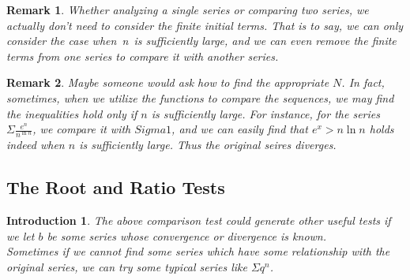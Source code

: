 \documentclass[12pt]{article}
\theoremstyle{oneline}
\newtheorem{remark}{Remark}[subsection]
\theoremstyle{twoline}
\newtheorem{introduction}{Introduction}
\begin{document}
\begin{remark}
  Whether analyzing a single series or comparing two series, we actually don't need to consider the finite initial terms. That is to say, we can only consider the case when n is sufficiently large, and we can even remove the finite terms from one series to compare it with another series.
\end{remark}

\begin{remark}
  Maybe someone would ask how to find the appropriate $N$. In fact, sometimes, when we utilize the functions to compare the sequences, we may find the inequalities hold only if $n$ is sufficiently large. For instance, for the series $\Sigma \frac{e^n}{n^{\ln n}}$, we compare it with $Sigma 1$, and we can easily find that $e^x>n\ln n$ holds indeed when $n$ is sufficiently large. Thus the original seires diverges.
\end{remark}

\subsection{The Root and Ratio Tests}
\begin{introduction}
  \hspace*{2em}
  The above comparison test could generate other useful tests if we let $b$ be some series whose convergence or divergence is known.\\
  \hspace*{2em} 
  Sometimes if we cannot find some series which have some relationship with the original series, we can try some typical series like $\Sigma q^n $.
\end{introduction}
\end{document}
